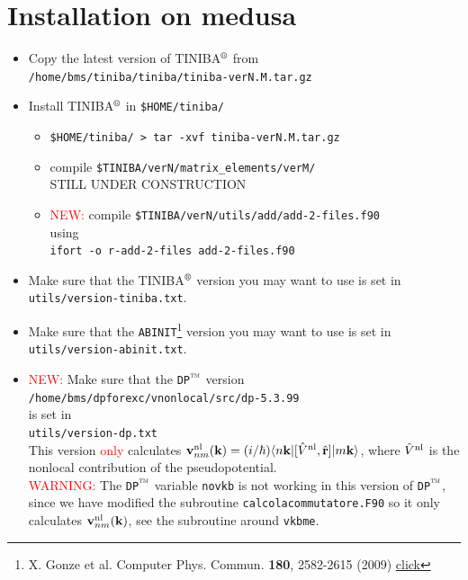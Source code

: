 \documentclass[12pt]{article}
\numberwithin{equation}{section}
\begin{document}
\section{Installation  on medusa}
\begin{itemize}

\item Copy the latest version of TINIBA$\reg$ from \\
\verb=/home/bms/tiniba/tiniba/tiniba-verN.M.tar.gz=

\item Install TINIBA$\reg$ in \verb=$HOME/tiniba/=
\begin{itemize}
\item  \verb=$HOME/tiniba/ > tar -xvf tiniba-verN.M.tar.gz =
\item compile \verb=$TINIBA/verN/matrix_elements/verM/=\\
STILL UNDER CONSTRUCTION
\item \textcolor{red}{NEW:}
 compile \verb=$TINIBA/verN/utils/add/add-2-files.f90=\\
 using\\
\verb=ifort -o r-add-2-files add-2-files.f90= 
\end{itemize}
\item
Make sure that the TINIBA$\reg$ version you may want to use is set
in \verb=utils/version-tiniba.txt=.

\item
  Make sure that the \verb=ABINIT=\copyr\footnote{X. Gonze et
    al. Computer Phys. Commun. {\bf 180}, 2582-2615 (2009) \href{http:www.abinit.org/}{click}}
 version you may want to use is set
in \verb=utils/version-abinit.txt=.
\item \textcolor{red}{NEW:}
  Make sure that the  \verb=DP=$\tm$ version\\
\verb=/home/bms/dpforexc/vnonlocal/src/dp-5.3.99=\\
is set
in\\
\verb=utils/version-dp.txt=\\
This version \textcolor{red}{only} calculates 
$\mathbf{v}^{\mathrm{nl}}_{nm}(\mathbf{k})=(i/\hbar)\langle n\mathbf{k} |[\hat V^{\mathrm{nl}},\hat{\mathbf{r}}]| m\mathbf{k} \rangle$,   
where $\hat V^{\mathrm{nl}}$ is the nonlocal contribution of the
pseudopotential.\\
\textcolor{red}{WARNING:}
The \verb=DP=$\tm$ variable \verb=novkb= is not working in this version of 
 \verb=DP=$\tm$, since we have modified the subroutine 
\verb=calcolacommutatore.F90= so it only calculates
$\mathbf{v}^{\mathrm{nl}}_{nm}(\mathbf{k})$, see the subroutine around \verb=vkbme=.
 

\end{itemize}
\end{document}
